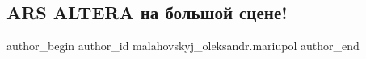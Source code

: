  
 
 
 
 

\subsection{ARS ALTERA на большой сцене!}
\label{sec:21_11_2016.fb.malahovskyj_oleksandr.mariupol.1.ars_altera_na_bolsho}

\ifcmt
 author_begin
   author_id malahovskyj_oleksandr.mariupol
 author_end
\fi
